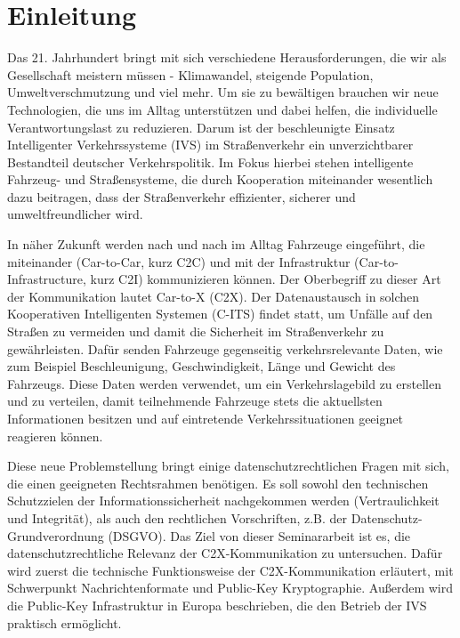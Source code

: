 
\section{Einleitung}
\label{ch:Introduction}


Das 21. Jahrhundert bringt mit sich verschiedene Herausforderungen, die wir als Gesellschaft meistern müssen - Klimawandel, steigende Population, Umweltverschmutzung und viel mehr. Um sie zu bewältigen brauchen wir neue Technologien, die uns im Alltag unterstützen und dabei helfen, die individuelle Verantwortungslast zu reduzieren. Darum ist der beschleunigte Einsatz Intelligenter Verkehrssysteme (IVS) im Straßenverkehr ein unverzichtbarer Bestandteil deutscher Verkehrspolitik. Im Fokus hierbei stehen intelligente Fahrzeug- und Straßensysteme, die durch Kooperation miteinander wesentlich dazu beitragen, dass der Straßenverkehr effizienter, sicherer und umweltfreundlicher wird.  

In näher Zukunft werden nach und nach im Alltag Fahrzeuge eingeführt, die miteinander (Car-to-Car, kurz C2C) und mit der Infrastruktur (Car-to-Infrastructure, kurz C2I) kommunizieren können. Der Oberbegriff zu dieser Art der Kommunikation lautet Car-to-X (C2X). Der Datenaustausch in solchen Kooperativen Intelligenten Systemen (C-ITS) findet statt, um Unfälle auf den Straßen zu vermeiden und damit die Sicherheit im Straßenverkehr zu gewährleisten. Dafür senden Fahrzeuge gegenseitig verkehrsrelevante Daten, wie zum Beispiel Beschleunigung, Geschwindigkeit, Länge und Gewicht des Fahrzeugs. Diese Daten werden verwendet, um ein Verkehrslagebild zu erstellen und zu verteilen, damit teilnehmende Fahrzeuge stets die aktuellsten Informationen besitzen und auf eintretende Verkehrssituationen geeignet reagieren können. 

Diese neue Problemstellung bringt einige datenschutzrechtlichen Fragen mit sich, die einen geeigneten Rechtsrahmen benötigen. Es soll sowohl den technischen Schutzzielen der Informationssicherheit nachgekommen werden (Vertraulichkeit und Integrität), als auch den rechtlichen Vorschriften, z.B. der Datenschutz-Grundverordnung (DSGVO). Das Ziel von dieser Seminararbeit ist es, die datenschutzrechtliche Relevanz der C2X-Kommunikation zu untersuchen. Dafür wird zuerst die technische Funktionsweise der C2X-Kommunikation erläutert, mit Schwerpunkt Nachrichtenformate und Public-Key Kryptographie. Außerdem wird die Public-Key Infrastruktur in Europa beschrieben, die den Betrieb der IVS praktisch ermöglicht. 


